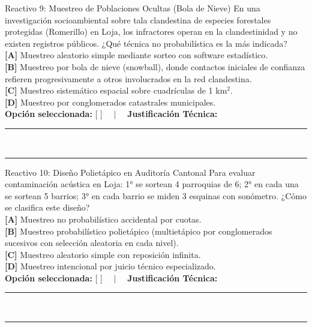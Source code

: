 \documentclass[11pt,a4paper]{article}
\begin{document}
\begin{reactivobox}{Reactivo 9: Muestreo de Poblaciones Ocultas (Bola de Nieve)}
En una investigación socioambiental sobre tala clandestina de especies forestales protegidas (Romerillo) en Loja, los infractores operan en la clandestinidad y no existen registros públicos. ¿Qué técnica no probabilística es la más indicada?\\
\textbf{[A]} Muestreo aleatorio simple mediante sorteo con software estadístico.\\
\textbf{[B]} Muestreo por bola de nieve (snowball), donde contactos iniciales de confianza refieren progresivamente a otros involucrados en la red clandestina.\\
\textbf{[C]} Muestreo sistemático espacial sobre cuadrículas de 1 km$^2$.\\
\textbf{[D]} Muestreo por conglomerados catastrales municipales.\\[4pt]
\textbf{Opción seleccionada:} [ \quad ] $\quad \vert \quad$ \textbf{Justificación Técnica:}\\
\rule{\linewidth}{0.4pt}\\[2pt]
\rule{\linewidth}{0.4pt}
\end{reactivobox}

\begin{reactivobox}{Reactivo 10: Diseño Polietápico en Auditoría Cantonal}
Para evaluar contaminación acústica en Loja: 1° se sortean 4 parroquias de 6; 2° en cada una se sortean 5 barrios; 3° en cada barrio se miden 3 esquinas con sonómetro. ¿Cómo se clasifica este diseño?\\
\textbf{[A]} Muestreo no probabilístico accidental por cuotas.\\
\textbf{[B]} Muestreo probabilístico polietápico (multietápico por conglomerados sucesivos con selección aleatoria en cada nivel).\\
\textbf{[C]} Muestreo aleatorio simple con reposición infinita.\\
\textbf{[D]} Muestreo intencional por juicio técnico especializado.\\[4pt]
\textbf{Opción seleccionada:} [ \quad ] $\quad \vert \quad$ \textbf{Justificación Técnica:}\\
\rule{\linewidth}{0.4pt}\\[2pt]
\rule{\linewidth}{0.4pt}
\end{reactivobox}
\end{document}
